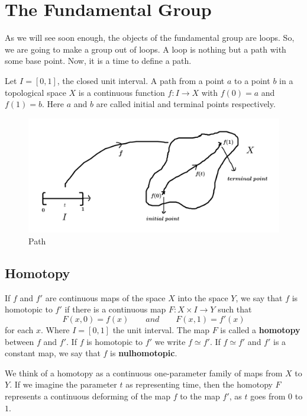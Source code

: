 \chapter{The Fundamental Group}

As we will see soon enough, the objects of the fundamental group are loops. So, we are going to make a group out of loops. A loop is nothing but a path with some base point. Now, it is a time to define a path.
\begin{definition}
Let $I=[0,1]$, the closed unit interval. A path from a point $a$ to a point $b$ in a topological space $X$ is a continuous function $f:I\rightarrow X$ with $f(0)=a$ and $f(1)=b$. Here $a$ and $b$ are called initial and terminal points respectively.
\end{definition}

\begin{figure}[hbt!]
\centering
\includegraphics[width=.7\textwidth]{./images/path.jpg}
\caption{Path}
\end{figure}


\section{Homotopy}
\begin{definition}
If $f$ and $f'$ are continuous maps of the space $X$ into the space $Y$, we say that $f$ is homotopic to $f'$ if there is a continuous map $F:X\times I \rightarrow Y$ such that
$$ F(x,0)=f(x) \qquad and \qquad F(x,1)=f'(x)$$
for each $x$. Where $I=[0,1]$ the unit interval. The map $F$ is called a \textbf{homotopy} between $f$ and $f'$. If $f$ is homotopic to $f'$ we write $f\simeq f'$. If $f\simeq f'$ and $f'$ is a constant map, we say that $f$ is \textbf{nulhomotopic}.
\end{definition}

We think of a homotopy as a continuous one-parameter family of maps from $X$ to $Y$. If we imagine the parameter $t$ as representing time, then the homotopy $F$ represents a continuous deforming of the map $f$ to the map $f'$, as $t$ goes from $0$ to $1$.

